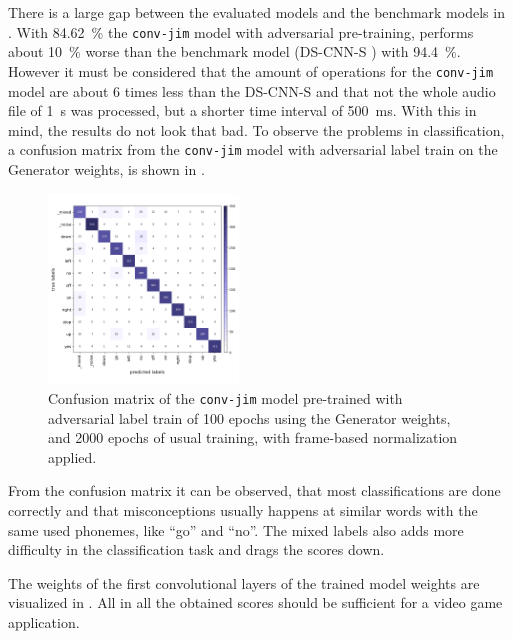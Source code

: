 There is a large gap between the evaluated models and the benchmark models in .
With \SI{84.62}{\percent} the \texttt{conv-jim} model with adversarial pre-training, performs about \SI{10}{\percent} worse than the benchmark model (DS-CNN-S \cite{Zhang2017}) with \SI{94.4}{\percent}.
However it must be considered that the amount of operations for the \texttt{conv-jim} model are about 6 times less than the DS-CNN-S and that not the whole audio file of \SI{1}{\second} was processed, but a shorter time interval of \SI{500}{\milli\second}.
With this in mind, the results do not look that bad.
To observe the problems in classification, a confusion matrix from the \texttt{conv-jim} model with adversarial label train on the Generator weights, is shown in .
\begin{figure}[!ht]
  \centering
  \includegraphics[width=0.45\textwidth]{./5_exp/figs/exp_final_confusion}
  \caption{Confusion matrix of the \texttt{conv-jim} model pre-trained with adversarial label train of 100 epochs using the Generator weights, and 2000 epochs of usual training, with frame-based normalization applied.}
  \label{fig:exp_final_confusion}
\end{figure}
\FloatBarrier
\noindent
From the confusion matrix it can be observed, that most classifications are done correctly and that misconceptions usually happens at similar words with the same used phonemes, like \enquote{go} and \enquote{no}.
The mixed labels also adds more difficulty in the classification task and drags the scores down.

The weights of the first convolutional layers of the trained model weights are visualized in .
All in all the obtained scores should be sufficient for a video game application.